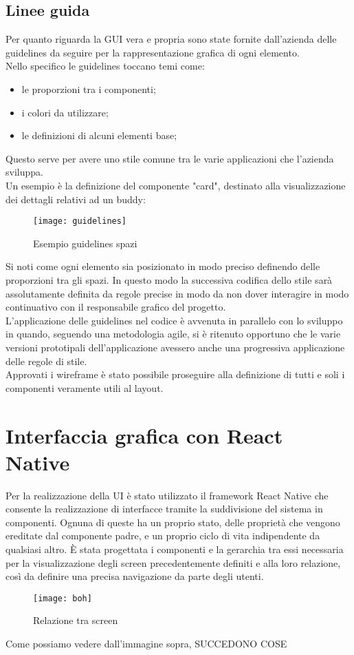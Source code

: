 \subsection{Linee guida}
Per quanto riguarda la GUI vera e propria sono state fornite dall'azienda delle 
guidelines da seguire per la rappresentazione grafica di ogni elemento. \\
Nello specifico le guidelines toccano temi come:
\begin{itemize}
	\item le proporzioni tra i componenti;
	\item i colori da utilizzare;
	\item le definizioni di alcuni elementi base;
\end{itemize}
Questo serve per avere uno stile comune tra le varie applicazioni che 
l'azienda sviluppa. \\
Un esempio è la definizione del componente "card", destinato alla 
visualizzazione dei dettagli relativi ad un buddy:
\begin{figure}[H] 
	\centering
	\texttt{[image: guidelines]}
	\caption{Esempio guidelines spazi}
\end{figure}
Si noti come ogni elemento sia posizionato in modo preciso definendo delle 
proporzioni tra gli spazi. In questo modo la successiva codifica dello stile sarà 
assolutamente definita da regole precise in modo da non dover interagire in modo 
continuativo con il responsabile grafico del progetto. \\
L'applicazione delle guidelines nel codice è avvenuta in parallelo con lo sviluppo 
in quando, seguendo una metodologia agile, si è ritenuto opportuno che le varie 
versioni prototipali dell'applicazione avessero anche una progressiva applicazione 
delle regole di stile.\\
Approvati i wireframe è stato possibile proseguire alla definizione di tutti 
e soli i componenti veramente utili al layout.

\section{Interfaccia grafica con React Native}
Per la realizzazione della UI è stato utilizzato il framework React Native che consente la realizzazione di interfacce tramite la suddivisione del sistema in componenti. Ognuna di queste ha un proprio stato, delle proprietà che vengono ereditate dal componente padre, e un proprio ciclo di vita indipendente da qualsiasi altro.
È stata progettata i componenti e la gerarchia tra essi necessaria per la visualizzazione degli screen precedentemente definiti e alla loro relazione, così da definire una precisa navigazione da parte degli utenti.
\begin{figure}[H] 
	\centering
	\texttt{[image: boh]}
	\caption{Relazione tra screen}
\end{figure}
Come possiamo vedere dall'immagine sopra, SUCCEDONO COSE
